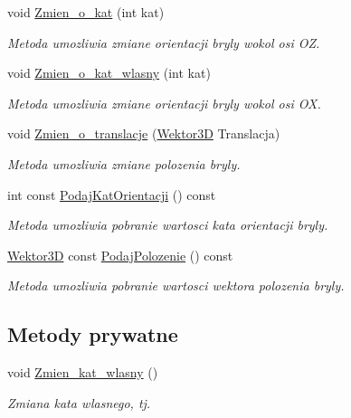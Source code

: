 \begin{DoxyCompactItemize}
void \hyperlink{classGraniastoslupSCN_af074e119fe4e8a34d4be489d4d5512fe}{Zmien\+\_\+o\+\_\+kat} (int kat)
\begin{DoxyCompactList}\small\item\em Metoda umozliwia zmiane orientacji bryly wokol osi OZ. \end{DoxyCompactList}\item 
void \hyperlink{classGraniastoslupSCN_a66b1dda997b41aaa596ad6b953f06c8c}{Zmien\+\_\+o\+\_\+kat\+\_\+wlasny} (int kat)
\begin{DoxyCompactList}\small\item\em Metoda umozliwia zmiane orientacji bryly wokol osi OX. \end{DoxyCompactList}\item 
void \hyperlink{classGraniastoslupSCN_a65db4e5bc006a5969f5a2ebb8b2adaea}{Zmien\+\_\+o\+\_\+translacje} (\hyperlink{classSWektor}{Wektor3D} Translacja)
\begin{DoxyCompactList}\small\item\em Metoda umozliwia zmiane polozenia bryly. \end{DoxyCompactList}\item 
int const \hyperlink{classGraniastoslupSCN_a22fa17548fa2785b1c9850bb166fa1e7}{Podaj\+Kat\+Orientacji} () const
\begin{DoxyCompactList}\small\item\em Metoda umozliwia pobranie wartosci kata orientacji bryly. \end{DoxyCompactList}\item 
\hyperlink{classSWektor}{Wektor3D} const \hyperlink{classGraniastoslupSCN_a48c31869ef862c487bb511d8a121005b}{Podaj\+Polozenie} () const
\begin{DoxyCompactList}\small\item\em Metoda umozliwia pobranie wartosci wektora polozenia bryly. \end{DoxyCompactList}\end{DoxyCompactItemize}
\subsection*{Metody prywatne}
\begin{DoxyCompactItemize}
\item 
void \hyperlink{classGraniastoslupSCN_a848f8d3f0298dda442fab7acec295f80}{Zmien\+\_\+kat\+\_\+wlasny} ()
\begin{DoxyCompactList}\small\item\em Zmiana kata wlasnego, tj. \end{DoxyCompactList}\end{DoxyCompactItemize}
